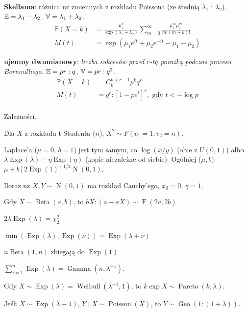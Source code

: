 \begin{multicols*}{2}
\begin{enumx}
	\item \textbf{Skellama}: różnica nz zmiennych z rozkładu Poissona (ze średnią $\lambda_1$ i $\lambda_2$).
	$\mathbb{E} = \lambda_1 - \lambda_2$, $\mathbb{V} = \lambda_1 + \lambda_2$.
	\begin{align*}
		\mathbb P(X = k) & = \frac{\mu_1^k}{\exp(\lambda_1 + \lambda_2)} \sum_{m = 0}^\infty \frac{\mu_1^m \mu_2^m}{m! (m + k)!} \\
		M(t) & = \exp(\mu_1 e^{it} + \mu_2 e^{-i t} - \mu_1 - \mu_2)
	\end{align*}

	\item \textbf{ujemny dwumianowy}: \emph{liczba sukcesów przed $r$-tą porażką podczas procesu Bernoulliego.}
	$\mathbb{E} = pr:q$, $\mathbb{V} = pr:q^2$.
	\begin{align*}
		\mathbb P(X = k) & =  C_k^{k+r-1} p^k q^r\\
		M(t) & = q^r : [1 - pe^t]^r, \mbox{ gdy } t < - \log p\\
	\end{align*}
\end{enumx}


Zależności.
\begin{enumx}
\item Dla $X$ z rozkładu t-Studenta ($n$), $X^2 \sim F(v_1 = 1, v_2 = n)$.
\item Laplace'a ($\mu = 0$, $b = 1$) jest tym samym, co $\log(x/y)$ (obie z $U(0,1)$) albo $\lambda \operatorname{Exp}(\lambda) - \eta \operatorname{Exp}(\eta)$ (kopie niezależne od siebie).
Ogólniej ($\mu, b$): $\mu + b [2 \operatorname{Exp}(1)]^{1/2} \operatorname{N}(0,1)$.
\item Iloraz nz $X, Y \sim \operatorname{N}(0,1)$ ma rozkład Cauchy'ego, $x_0 = 0$, $\gamma = 1$.
\item Gdy $X \sim \operatorname{Beta}(a, b)$, to $bX : (a - aX) \sim \operatorname{F}(2a, 2b)$
\item $2 \lambda \operatorname{Exp}(\lambda) = \chi^2_2$
\item $\min(\operatorname{Exp}(\lambda), \operatorname{Exp}(\nu)) = \operatorname{Exp}(\lambda + \nu)$
\item $n \operatorname{Beta}(1, n)$ zbiegają do $\operatorname{Exp} (1)$
\item $\sum_{i=1}^n \operatorname{Exp} (\lambda) = \operatorname{Gamma} (n, \lambda^{-1})$.
\item Gdy $X \sim \operatorname{Exp}(\lambda) = \operatorname{Weibull}(\lambda^{-1},1)$, to $k \exp X \sim \operatorname{Pareto}(k, \lambda)$.
\item Jeśli $X \sim \operatorname{Exp}(\lambda - 1)$, $Y \mid X \sim \operatorname{Poisson}(X)$, to $Y \sim \operatorname{Geo}(1 : (1 + \lambda))$.
\end{enumx}
\end{multicols*}


